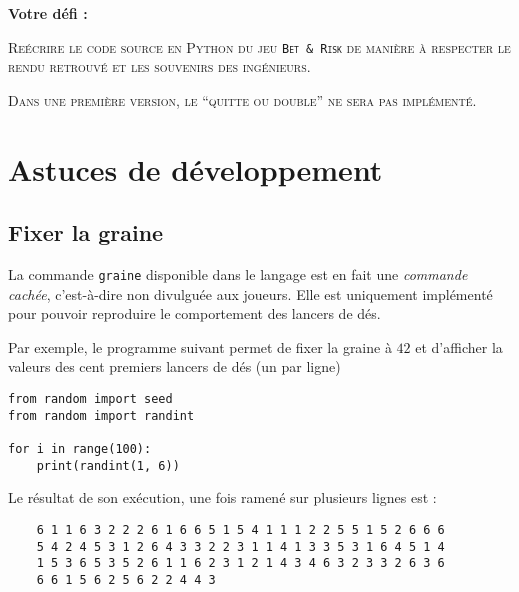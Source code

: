 \documentclass{article}
\begin{document}
\bigskip
\null
\bigskip
\null
\bigskip


\noindent
\textbf{Votre défi :}

\bigskip

\begin{center}
	\begin{minipage}{10cm}
		\textsc	{Reécrire le code source en Python du jeu {\tt Bet \& Risk} de manière à respecter
					le rendu retrouvé et les souvenirs des ingénieurs.}

		\vspace{0.5cm}

		\textsc	{Dans une première version, le ``quitte ou double'' ne sera pas implémenté.}
	\end{minipage}
\end{center}

\bigskip
\null
\bigskip





\newpage

\section{Astuces de développement}

\subsection{Fixer la graine}

La commande {\tt graine} disponible dans le langage est en fait une \emph{commande cachée},
c'est-à-dire non divulguée aux joueurs. Elle est uniquement implémenté pour pouvoir reproduire
le comportement des lancers de dés.

\medskip

Par exemple, le programme suivant permet de fixer la graine à $42$ et d'afficher la valeurs
des cent premiers lancers de dés (un par ligne)

\begin{verbatim}
from random import seed
from random import randint

for i in range(100):
    print(randint(1, 6))
\end{verbatim}
Le résultat de son exécution, une fois ramené sur plusieurs lignes est :
\begin{center}
	\begin{verbatim}
	6 1 1 6 3 2 2 2 6 1 6 6 5 1 5 4 1 1 1 2 2 5 5 1 5 2 6 6 6
	5 4 2 4 5 3 1 2 6 4 3 3 2 2 3 1 1 4 1 3 3 5 3 1 6 4 5 1 4
	1 5 3 6 5 3 5 2 6 1 1 6 2 3 1 2 1 4 3 4 6 3 2 3 3 2 6 3 6
	6 6 1 5 6 2 5 6 2 2 4 4 3
	\end{verbatim}
\end{center}
\end{document}

